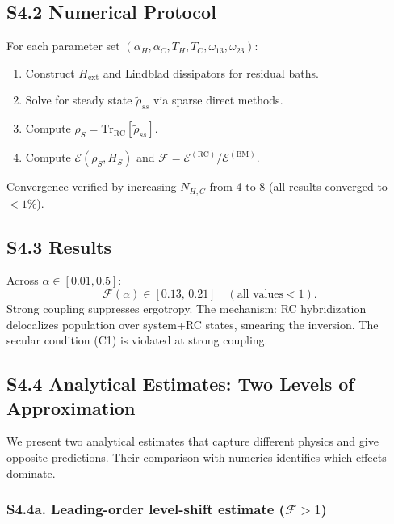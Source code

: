 \documentclass[prl,twocolumn,superscriptaddress,amsmath,amssymb]{revtex4-2}
\begin{document}
\subsection{S4.2 Numerical Protocol}

For each parameter set $(\alpha_H, \alpha_C, T_H, T_C, \omega_{13}, \omega_{23})$:
\begin{enumerate}
\item Construct $H_{\mathrm{ext}}$ and Lindblad dissipators for residual baths.
\item Solve for steady state $\tilde\rho_{ss}$ via sparse direct methods.
\item Compute $\rho_S = \mathrm{Tr}_{\mathrm{RC}}[\tilde\rho_{ss}]$.
\item Compute $\mathcal{E}(\rho_S, H_S)$ and $\mathcal{F} = \mathcal{E}^{(\mathrm{RC})}/\mathcal{E}^{(\mathrm{BM})}$.
\end{enumerate}
Convergence verified by increasing $N_{H,C}$ from 4 to 8 (all results converged to $< 1\%$).

\subsection{S4.3 Results}

Across $\alpha \in [0.01, 0.5]$:
\begin{equation}
\mathcal{F}(\alpha) \in [0.13,\, 0.21] \quad (\text{all values} < 1).
\end{equation}
Strong coupling suppresses ergotropy. The mechanism: RC hybridization delocalizes population over system+RC states, smearing the inversion. The secular condition (C1) is violated at strong coupling.

\subsection{S4.4 Analytical Estimates: Two Levels of Approximation}

We present two analytical estimates that capture different physics and give opposite predictions. Their comparison with numerics identifies which effects dominate.

\subsubsection{S4.4a. Leading-order level-shift estimate ($\mathcal{F} > 1$)}
\end{document}
